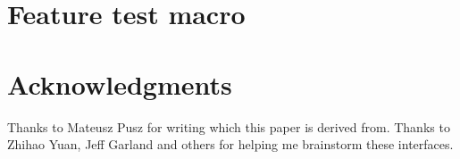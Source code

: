 \documentclass{wg21}
\begin{document}
\section{Feature test macro}

\section{Acknowledgments}

Thanks to Mateusz Pusz for writing  which this paper is derived from.
Thanks to Zhihao Yuan, Jeff Garland and others for helping me brainstorm these interfaces.



\end{document}
